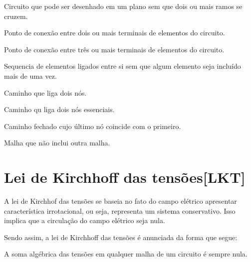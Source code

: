 \documentclass[12pt,fleqn]{book} %
\begin{document}
        \begin{definition}
        Circuito que pode ser desenhado em um plano sem que dois ou mais ramos se cruzem.
        \end{definition}
        \begin{definition}[Nó]
        Ponto de conexão entre dois ou mais terminais de elementos do circuito.
        \end{definition}
        \begin{definition}[Nó essencial]
        Ponto de conexão entre três ou mais terminais de elementos do circuito.
        \end{definition}
        \begin{definition}[Caminho]
        Sequencia de elementos ligados entre si sem que algum elemento seja incluído mais de uma vez.
        \end{definition}
        \begin{definition}[Ramo]
        Caminho que liga dois nós.
        \end{definition}
        \begin{definition}
        Caminho qu liga dois nós essenciais.
        \end{definition}
        \begin{definition}[Malha]
        Caminho fechado cujo último nó coincide com o primeiro.
        \end{definition}
        \begin{definition}
        Malha que não inclui outra malha.
        \end{definition}
        
    
    \section{Lei de Kirchhoff das tensões[LKT]}
    
    A lei de Kirchhof das tensões se baseia no fato do campo elétrico apresentar característica irrotacional, ou seja, representa um sistema conservativo. Isso implica que a circulação do campo elétrico seja nula.
    
    Sendo assim, a lei de Kirchhoff das tensões é anunciada da forma que segue:

\begin{definition}[LKT]
A soma algébrica das tensões em qualquer malha de um circuito é sempre nula.
\end{definition}    
\end{document}
